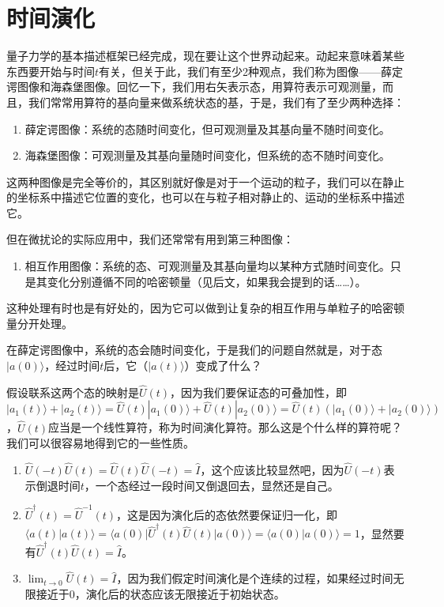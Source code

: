 \documentclass{ctexart}
\begin{document}
\section{时间演化}

量子力学的基本描述框架已经完成，现在要让这个世界动起来。动起来意味着某些东西要开始与时间$t$有关，但关于此，我们有至少2种观点，我们称为图像——薛定谔图像和海森堡图像。回忆一下，我们用右矢表示态，用算符表示可观测量，而且，我们常常用算符的基向量来做系统状态的基，于是，我们有了至少两种选择：

\begin{enumerate}
\item 薛定谔图像：系统的态随时间变化，但可观测量及其基向量不随时间变化。
\item 海森堡图像：可观测量及其基向量随时间变化，但系统的态不随时间变化。
\end{enumerate}

这两种图像是完全等价的，其区别就好像是对于一个运动的粒子，我们可以在静止的坐标系中描述它位置的变化，也可以在与粒子相对静止的、运动的坐标系中描述它。

但在微扰论的实际应用中，我们还常常有用到第三种图像：

\begin{enumerate}[resume]
\item 相互作用图像：系统的态、可观测量及其基向量均以某种方式随时间变化。只是其变化分别遵循不同的哈密顿量（见后文，如果我会提到的话……）。
\end{enumerate}

这种处理有时也是有好处的，因为它可以做到让复杂的相互作用与单粒子的哈密顿量分开处理。

在薛定谔图像中，系统的态会随时间变化，于是我们的问题自然就是，对于态$|a(0)\rangle$，经过时间$t$后，它（$|a(t)\rangle$）变成了什么？

假设联系这两个态的映射是$\hat{U}(t)$，因为我们要保证态的可叠加性，即$|a_1(t)\rangle+|a_2(t)\rangle=\hat{U}(t)|a_1(0)\rangle+\hat{U}(t)|a_2(0)\rangle=\hat{U}(t)(|a_1(0)\rangle+|a_2(0)\rangle)$，$\hat{U}(t)$应当是一个线性算符，称为时间演化算符。那么这是个什么样的算符呢？我们可以很容易地得到它的一些性质。

\begin{enumerate}
\item $\hat{U}(-t)\hat{U}(t)=\hat{U}(t)\hat{U}(-t)=\hat{I}$，这个应该比较显然吧，因为$\hat{U}(-t)$表示倒退时间$t$，一个态经过一段时间又倒退回去，显然还是自己。
\item $\hat{U}^\dagger(t)=\hat{U}^{-1}(t)$，这是因为演化后的态依然要保证归一化，即$\langle a(t)|a(t)\rangle=\langle a(0)|\hat{U}^\dagger(t)\hat{U}(t)|a(0)\rangle=\langle a(0)|a(0)\rangle=1$，显然要有$\hat{U}^\dagger(t)\hat{U}(t)=\hat{I}$。
\item $\lim_{t\to 0}\hat{U}(t)=\hat{I}$，因为我们假定时间演化是个连续的过程，如果经过时间无限接近于0，演化后的状态应该无限接近于初始状态。
\end{enumerate}
\end{document}
